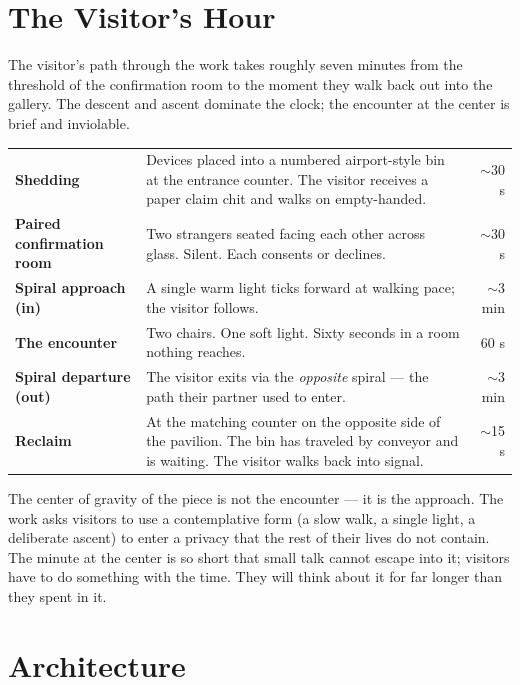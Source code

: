 \documentclass[]{anvil-installation}
\begin{document}
\section{The Visitor's Hour}

The visitor's path through the work takes roughly seven minutes from the threshold of the confirmation room to the moment they walk back out into the gallery. The descent and ascent dominate the clock; the encounter at the center is brief and inviolable.

\begin{metricbox}
\begin{tabularx}{\textwidth}{@{} >{\bfseries}l X r @{}}
Shedding & Devices placed into a numbered airport-style bin at the entrance counter. The visitor receives a paper claim chit and walks on empty-handed. & $\sim$30 s \\
Paired confirmation room & Two strangers seated facing each other across glass. Silent. Each consents or declines. & $\sim$30 s \\
Spiral approach (in) & A single warm light ticks forward at walking pace; the visitor follows. & $\sim$3 min \\
The encounter & Two chairs. One soft light. Sixty seconds in a room nothing reaches. & 60 s \\
Spiral departure (out) & The visitor exits via the \emph{opposite} spiral --- the path their partner used to enter. & $\sim$3 min \\
Reclaim & At the matching counter on the opposite side of the pavilion. The bin has traveled by conveyor and is waiting. The visitor walks back into signal. & $\sim$15 s \\
\end{tabularx}
\end{metricbox}

The center of gravity of the piece is not the encounter --- it is the approach. The work asks visitors to use a contemplative form (a slow walk, a single light, a deliberate ascent) to enter a privacy that the rest of their lives do not contain. The minute at the center is so short that small talk cannot escape into it; visitors have to do something with the time. They will think about it for far longer than they spent in it.

\section{Architecture}
\end{document}
